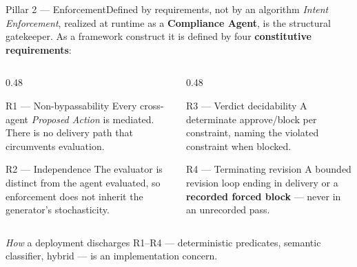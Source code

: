 \documentclass[aspectratio=169,10pt]{beamer}
\newcommand{\key}[1]{\textcolor{aiAccent}{\textbf{#1}}}
\newcommand{\cn}[1]{\textcolor{aiPrimary}{\textit{#1}}}   %
\begin{document}
\begin{frame}{Pillar 2 --- Enforcement}{Defined by requirements, not by an algorithm}
  \cn{Intent Enforcement}, realized at runtime as a \key{Compliance Agent}, is the
  structural gatekeeper. As a framework construct it is defined by four
  \key{constitutive requirements}:
  \medskip
  \begin{columns}[T,onlytextwidth]
    \begin{column}{0.48\textwidth}
      \begin{block}{R1 --- Non-bypassability}
        \small Every cross-agent \cn{Proposed Action} is mediated. There is no
        delivery path that circumvents evaluation.
      \end{block}
      \begin{block}{R2 --- Independence}
        \small The evaluator is distinct from the agent evaluated, so enforcement
        does not inherit the generator's stochasticity.
      \end{block}
    \end{column}
    \begin{column}{0.48\textwidth}
      \begin{block}{R3 --- Verdict decidability}
        \small A determinate approve/block per constraint, naming the violated
        constraint when blocked.
      \end{block}
      \begin{block}{R4 --- Terminating revision}
        \small A bounded revision loop ending in delivery or a \key{recorded
        forced block} --- never in an unrecorded pass.
      \end{block}
    \end{column}
  \end{columns}
  \vspace{0.6em}
  \begin{center}\small
    \emph{How} a deployment discharges R1--R4 --- deterministic predicates,
    semantic classifier, hybrid --- is an implementation concern.
  \end{center}
\end{frame}
\end{document}
